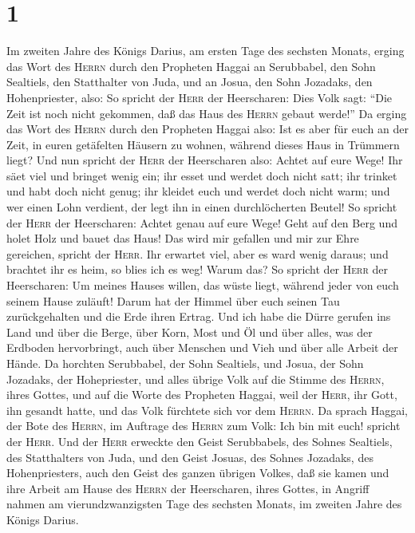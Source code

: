 \hypertarget{section}{%
\section{1}\label{section}}

 Im zweiten Jahre des Königs Darius, am ersten Tage des
sechsten Monats, erging das Wort des \textsc{Herrn} durch den Propheten
Haggai an Serubbabel, den Sohn Sealtiels, den Statthalter von Juda, und
an Josua, den Sohn Jozadaks, den Hohenpriester, also:  So
spricht der \textsc{Herr} der Heerscharen: Dies Volk sagt: ``Die Zeit
ist noch nicht gekommen, daß das Haus des \textsc{Herrn} gebaut werde!''
 Da erging das Wort des \textsc{Herrn} durch den Propheten
Haggai also:  Ist es aber für euch an der Zeit, in euren
getäfelten Häusern zu wohnen, während dieses Haus in Trümmern liegt?
 Und nun spricht der \textsc{Herr} der Heerscharen also:
Achtet auf eure Wege!  Ihr säet viel und bringet wenig
ein; ihr esset und werdet doch nicht satt; ihr trinket und habt doch
nicht genug; ihr kleidet euch und werdet doch nicht warm; und wer einen
Lohn verdient, der legt ihn in einen durchlöcherten Beutel!
 So spricht der \textsc{Herr} der Heerscharen: Achtet
genau auf eure Wege!  Geht auf den Berg und holet Holz und
bauet das Haus! Das wird mir gefallen und mir zur Ehre gereichen,
spricht der \textsc{Herr}.  Ihr erwartet viel, aber es
ward wenig daraus; und brachtet ihr es heim, so blies ich es weg! Warum
das? So spricht der \textsc{Herr} der Heerscharen: Um meines Hauses
willen, das wüste liegt, während jeder von euch seinem Hause zuläuft!
 Darum hat der Himmel über euch seinen Tau zurückgehalten
und die Erde ihren Ertrag.  Und ich habe die Dürre
gerufen ins Land und über die Berge, über Korn, Most und Öl und über
alles, was der Erdboden hervorbringt, auch über Menschen und Vieh und
über alle Arbeit der Hände.  Da horchten Serubbabel, der
Sohn Sealtiels, und Josua, der Sohn Jozadaks, der Hohepriester, und
alles übrige Volk auf die Stimme des \textsc{Herrn}, ihres Gottes, und
auf die Worte des Propheten Haggai, weil der \textsc{Herr}, ihr Gott,
ihn gesandt hatte, und das Volk fürchtete sich vor dem \textsc{Herrn}.
 Da sprach Haggai, der Bote des \textsc{Herrn}, im
Auftrage des \textsc{Herrn} zum Volk: Ich bin mit euch! spricht der
\textsc{Herr}.  Und der \textsc{Herr} erweckte den Geist
Serubbabels, des Sohnes Sealtiels, des Statthalters von Juda, und den
Geist Josuas, des Sohnes Jozadaks, des Hohenpriesters, auch den Geist
des ganzen übrigen Volkes, daß sie kamen und ihre Arbeit am Hause des
\textsc{Herrn} der Heerscharen, ihres Gottes, in Angriff nahmen
 am vierundzwanzigsten Tage des sechsten Monats, im
zweiten Jahre des Königs Darius.

